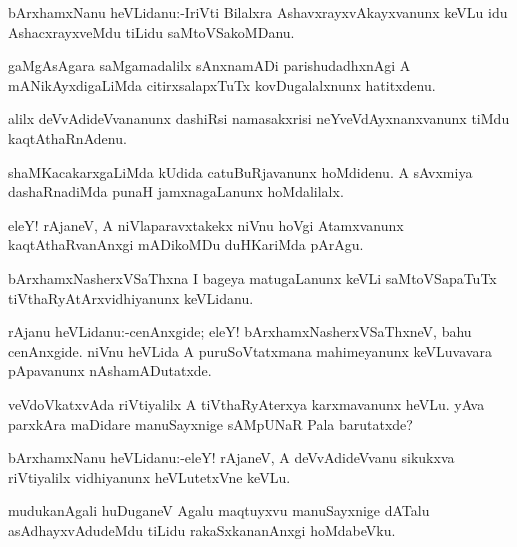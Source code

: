\documentclass{article}
\begin{document}

\begin{mn}%
bArxhamxNanu heVLidanu:-IriVti Bilalxra AshavxrayxvAkayxvanunx keVLu idu AshacxrayxveMdu 
tiLidu saMtoVSakoMDanu.
\end{mn}

\begin{mn}%
gaMgAsAgara saMgamadalilx sAnxnamADi parishudadhxnAgi A mANikAyxdigaLiMda citirxsalapxTuTx 
kovDugalalxnunx hatitxdenu.
\end{mn}

\begin{mn}%
alilx deVvAdideVvananunx dashiRsi namasakxrisi neYveVdAyxnanxvanunx tiMdu kaqtAthaRnAdenu.
\end{mn}

\begin{mn}%
shaMKacakarxgaLiMda kUdida catuBuRjavanunx hoMdidenu. A sAvxmiya dashaRnadiMda punaH 
jamxnagaLanunx hoMdalilalx.
\end{mn}

\begin{mn}%
eleY! rAjaneV, A niVlaparavxtakekx niVnu hoVgi Atamxvanunx kaqtAthaRvanAnxgi mADikoMDu 
duHKariMda pArAgu.
\end{mn}

\begin{mn}%
bArxhamxNasherxVSaThxna I bageya matugaLanunx keVLi saMtoVSapaTuTx 
tiVthaRyAtArxvidhiyanunx keVLidanu.
\end{mn}

\begin{mn}%
rAjanu heVLidanu:-cenAnxgide; eleY! bArxhamxNasherxVSaThxneV, bahu cenAnxgide. niVnu 
heVLida A puruSoVtatxmana mahimeyanunx keVLuvavara pApavanunx nAshamADutatxde.
\end{mn}

\begin{mn}%
veVdoVkatxvAda riVtiyalilx A tiVthaRyAterxya karxmavanunx heVLu. yAva parxkAra maDidare 
manuSayxnige sAMpUNaR Pala barutatxde?
\end{mn}

\begin{mn}%
bArxhamxNanu heVLidanu:-eleY! rAjaneV, A deVvAdideVvanu sikukxva riVtiyalilx vidhiyanunx 
heVLutetxVne keVLu.
\end{mn}

\begin{mn}%
mudukanAgali huDuganeV Agalu maqtuyxvu manuSayxnige dATalu asAdhayxvAdudeMdu tiLidu 
rakaSxkananAnxgi hoMdabeVku.
\end{mn}
\end{document}
